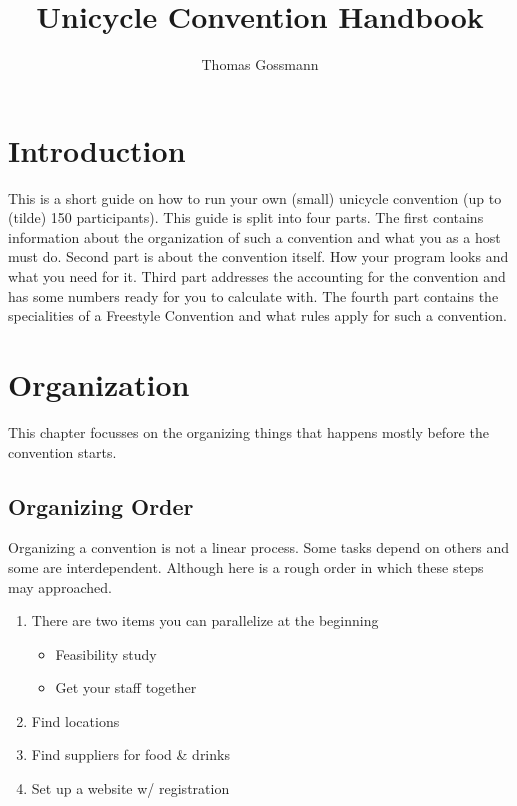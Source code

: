 \documentclass[11pt]{report}
\title{Unicycle Convention Handbook}
\author{Thomas Gossmann}
\date{}
\begin{document}
\maketitle

\setcounter{tocdepth}{1}
\tableofcontents

\chapter{Introduction}

This is a short guide on how to run your own (small) unicycle convention (up to 
(tilde) %
150 participants). This guide is split into four parts. The first contains 
information about the organization of such a convention and what you as a host 
must do. Second part is about the convention itself. How your program looks and 
what you need for it. Third part addresses the accounting for the convention and 
has some numbers ready for you to calculate with. The fourth part contains the 
specialities of a Freestyle Convention and what rules apply for such a 
convention.

\chapter{Organization}

This chapter focusses on the organizing things that happens mostly before the 
convention starts.

\section{Organizing Order}

Organizing a convention is not a linear process. Some tasks depend on others and 
some are interdependent. Although here is a rough order in which these steps may 
approached.

\begin{enumerate}
	\item There are two items you can parallelize at the beginning
		\begin{itemize}
			\item Feasibility study
			\item Get your staff together
		\end{itemize}
	\item Find locations
	\item Find suppliers for food & drinks
	\item Set up a website w/ registration
\end{enumerate}
\end{document}
